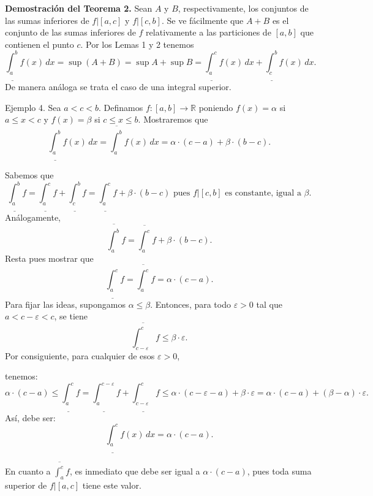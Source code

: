 \documentclass[12pt,oneside]{book}
\begin{document}
\textbf{Demostración del Teorema 2.} Sean \(A\) y \(B\), respectivamente, los conjuntos de las sumas inferiores de \(f|[a, c]\) y \(f|[c, b]\). Se ve fácilmente que \(A + B\) es el conjunto de las sumas inferiores de \(f\) relativamente a las particiones de \([a, b]\) que contienen el punto \(c\). Por los Lemas 1 y 2 tenemos
\[\underline{\int_a^b} f(x) \, dx = \sup(A + B) = \sup A + \sup B = \underline{\int_a^c} f(x) \, dx + \underline{\int_c^b} f(x) \, dx.\]
De manera análoga se trata el caso de una integral superior.

Ejemplo 4. Sea \(a < c < b\). Definamos \(f: [a, b] \to \mathbb{R}\) poniendo \(f(x) = \alpha\) si \(a \leq x < c\) y \(f(x) = \beta\) si \(c \leq x \leq b\). Mostraremos que
\[\underline{\int_a^b} f(x) \, dx = \overline{\int_a^b} f(x) \, dx = \alpha \cdot (c - a) + \beta \cdot (b - c).\]

Sabemos que
\[\underline{\int_a^b} f = \underline{\int_a^c} f + \underline{\int_c^b} f = \underline{\int_a^c} f + \beta \cdot (b - c) \text{ pues } f|[c, b] \text{ es constante, igual a } \beta.\]
Análogamente,
\[\overline{\int_a^b} f = \overline{\int_a^c} f + \beta \cdot (b - c).\]
Resta pues mostrar que
\[\underline{\int_a^c} f = \overline{\int_a^c} f = \alpha \cdot (c - a).\]
Para fijar las ideas, supongamos \(\alpha \leq \beta\). Entonces, para todo \(\varepsilon > 0\) tal que \(a < c - \varepsilon < c\), se tiene
\[
\overline{\int_{c-\varepsilon}^{c}} f \leq \beta \cdot \varepsilon.
\]
Por consiguiente, para cualquier de esos \(\varepsilon > 0\),

tenemos:
\[
\alpha \cdot (c-a) \leq \underline{\int_{a}^{c}} f = \underline{\int_{a}^{c-\varepsilon}} f + \underline{\int_{c-\varepsilon}^{c}} f \leq \alpha \cdot (c-\varepsilon-a) + \beta \cdot \varepsilon = \alpha \cdot (c-a) + (\beta-\alpha) \cdot \varepsilon.
\]
Así, debe ser:
\[
\underline{\int_{a}^{c}} f(x) \, dx = \alpha \cdot (c-a).
\]

En cuanto a \(\overline{\int_{a}^{c}} f\), es inmediato que debe ser igual a \(\alpha \cdot (c-a)\), pues toda suma superior de \(f|[a,c]\) tiene este valor.
\end{document}
